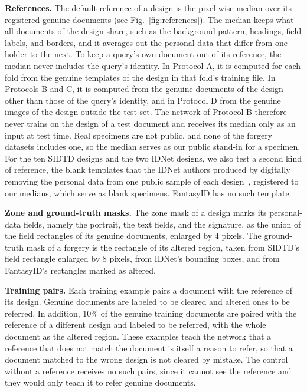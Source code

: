\documentclass[12pt,a4paper]{article}
\begin{document}
\textbf{References.} The default reference of a design is the pixel-wise median over its registered genuine documents (see Fig.~\ref{fig:references}). The median keeps what all documents of the design share, such as the background pattern, headings, field labels, and borders, and it averages out the personal data that differ from one holder to the next. To keep a query's own document out of its reference, the median never includes the query's identity. In Protocol A, it is computed for each fold from the genuine templates of the design in that fold's training file. In Protocols B and C, it is computed from the genuine documents of the design other than those of the query's identity, and in Protocol D from the genuine images of the design outside the test set. The network of Protocol B therefore never trains on the design of a test document and receives its median only as an input at test time. Real specimens are not public, and none of the forgery datasets includes one, so the median serves as our public stand-in for a specimen. For the ten SIDTD designs and the two IDNet designs, we also test a second kind of reference, the blank templates that the IDNet authors produced by digitally removing the personal data from one public sample of each design~\cite{guan2024idnetarxiv}, registered to our medians, which serve as blank specimens. FantasyID has no such template.

\textbf{Zone and ground-truth masks.} The zone mask of a design marks its personal-data fields, namely the portrait, the text fields, and the signature, as the union of the field rectangles of its genuine documents, enlarged by 4 pixels. The ground-truth mask of a forgery is the rectangle of its altered region, taken from SIDTD's field rectangle enlarged by 8 pixels, from IDNet's bounding boxes, and from FantasyID's rectangles marked as altered.

\textbf{Training pairs.} Each training example pairs a document with the reference of its design. Genuine documents are labeled to be cleared and altered ones to be referred. In addition, 10\% of the genuine training documents are paired with the reference of a different design and labeled to be referred, with the whole document as the altered region. These examples teach the network that a reference that does not match the document is itself a reason to refer, so that a document matched to the wrong design is not cleared by mistake. The control without a reference receives no such pairs, since it cannot see the reference and they would only teach it to refer genuine documents.
\end{document}
